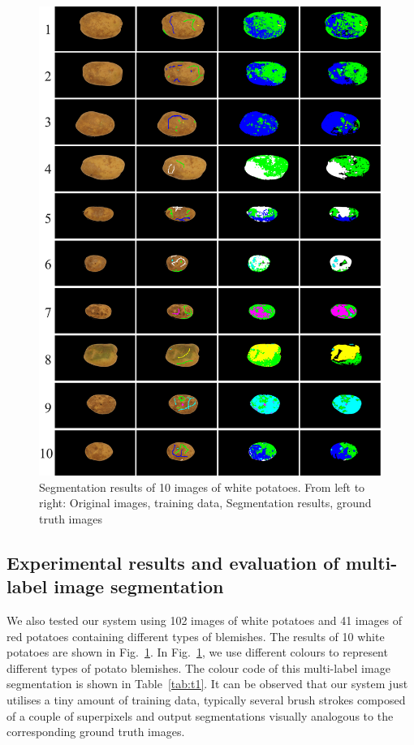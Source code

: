 \documentclass[twocolumn]{svjour3}          %
\begin{document}
\begin{figure} [htbp!]
\centering
\includegraphics[width=0.95\linewidth]{r1.jpg}
\caption{Segmentation results of 10 images of white potatoes. From left to right: Original images, training data, Segmentation results, ground truth images}
\label{fig:r1}
\end{figure}

\subsection{Experimental results and evaluation of multi-label image segmentation}
We also tested our system using 102 images of white potatoes and 41 images of red potatoes containing different types of blemishes. The results of 10 white potatoes are shown in Fig.~\ref{fig:r1}. In Fig.~\ref{fig:r1}, we use different colours to represent different types of potato blemishes. The colour code of this multi-label image segmentation is shown in Table~\ref{tab:t1}. It can be observed that our system just utilises a tiny amount of training data, typically several brush strokes composed of a couple of superpixels and output segmentations visually analogous to the corresponding ground truth images.
\end{document}
